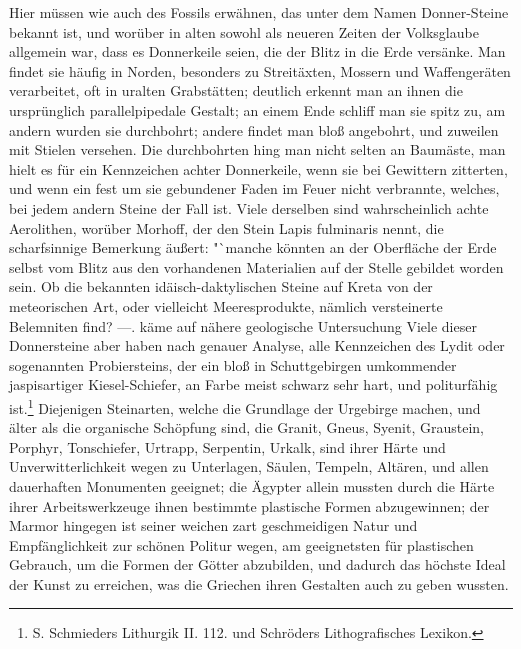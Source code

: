 \documentclass[a4paper, 11pt, oneside, polutonikogreek, german]{article}
\begin{document}
Hier müssen wie auch des Fossils erwähnen, das unter dem Namen Donner-Steine bekannt ist, und worüber in alten sowohl als neueren Zeiten der Volksglaube allgemein war, dass es Donnerkeile seien, die der Blitz in die Erde versänke. Man findet sie häufig in Norden, besonders zu Streitäxten, Mossern und Waffengeräten verarbeitet, oft in uralten Grabstätten; deutlich erkennt man an ihnen die ursprünglich parallelpipedale Gestalt; an einem Ende schliff man sie spitz zu, am andern wurden sie durchbohrt; andere findet man bloß angebohrt, und zuweilen mit Stielen versehen. Die durchbohrten hing man nicht selten an Baumäste, man hielt es für ein Kennzeichen achter Donnerkeile, wenn sie bei Gewittern zitterten, und wenn ein fest um sie gebundener Faden im Feuer nicht verbrannte, welches, bei jedem andern Steine der Fall ist. Viele derselben sind wahrscheinlich achte Aerolithen, worüber Morhoff, der den Stein Lapis fulminaris nennt, die scharfsinnige Bemerkung äußert: "`manche könnten an der Oberfläche der Erde selbst vom Blitz aus den vorhandenen Materialien auf der Stelle gebildet worden sein. Ob die bekannten idäisch-daktylischen Steine auf Kreta von der meteorischen Art, oder vielleicht Meeresprodukte, nämlich versteinerte Belemniten find? ---. käme auf nähere geologische Untersuchung Viele dieser Donnersteine aber haben nach genauer Analyse, alle Kennzeichen des Lydit oder sogenannten Probiersteins, der ein bloß in Schuttgebirgen umkommender jaspisartiger Kiesel-Schiefer, an Farbe meist schwarz sehr hart, und politurfähig ist.\footnote{S. Schmieders Lithurgik II. 112. und Schröders Lithografisches Lexikon.} Diejenigen Steinarten, welche die Grundlage der Urgebirge machen, und älter als die organische Schöpfung sind, die Granit, Gneus, Syenit, Graustein, Porphyr, Tonschiefer, Urtrapp, Serpentin, Urkalk, sind ihrer Härte und Unverwitterlichkeit wegen zu Unterlagen, Säulen, Tempeln, Altären, und allen dauerhaften Monumenten geeignet; die Ägypter allein mussten durch die Härte ihrer Arbeitswerkzeuge ihnen bestimmte plastische Formen abzugewinnen; der Marmor hingegen ist seiner weichen zart geschmeidigen Natur und Empfänglichkeit zur schönen Politur wegen, am geeignetsten für plastischen Gebrauch, um die Formen der Götter abzubilden, und dadurch das höchste Ideal der Kunst zu erreichen, was die Griechen ihren Gestalten auch zu geben wussten.
\end{document}
